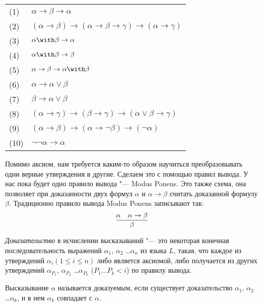 \begin{tabular}{ll}
(1) & $\alpha \rightarrow \beta \rightarrow \alpha$ \\
(2) & $(\alpha \rightarrow \beta) \rightarrow (\alpha \rightarrow \beta \rightarrow \gamma) \rightarrow (\alpha \rightarrow \gamma)$ \\
(3) & $\alpha \with \beta \rightarrow \alpha$\\
(4) & $\alpha \with \beta \rightarrow \beta$\\
(5) & $\alpha \rightarrow \beta \rightarrow \alpha \with \beta$\\
(6) & $\alpha \rightarrow \alpha \vee \beta$\\
(7) & $\beta \rightarrow \alpha \vee \beta$\\
(8) & $(\alpha \rightarrow \gamma) \rightarrow (\beta \rightarrow \gamma) \rightarrow (\alpha \vee \beta \rightarrow \gamma)$\\
(9) & $(\alpha \rightarrow \beta) \rightarrow (\alpha \rightarrow \neg \beta) \rightarrow (\neg \alpha)$\\
(10) & $\neg \neg \alpha \rightarrow \alpha$
\end{tabular}

Помимо аксиом, нам требуется каким-то образом научиться преобразовывать одни верные утверждения
в другие.
Сделаем это с помощью правил вывода. У нас пока будет одно правило вывода "--- Modus Ponens.
Это также схема, она позволяет при доказанности двух формул $\alpha$ и $\alpha \rightarrow \beta$
считать доказанной формулу $\beta$. Традиционно правило вывода Modus Ponens записывают так:
\[\infer{\beta}{\alpha & \alpha \rightarrow \beta}\]

\begin{definition}[доказательство] \emph{Доказательство} в исчислении высказываний "--- 
это некоторая конечная последовательность выражений 
$\alpha_1$, $\alpha_2$ \dots $\alpha_n$
из языка $L$, такая, что каждое из утверждений $\alpha_i (1 \le i \le n)$
либо является аксиомой, либо получается из других
утверждений $\alpha_{P_1}$, $\alpha_{P_2}$ \dots $\alpha_{P_k}$ 
($P_1 \dots P_k < i$) по правилу вывода.
\end{definition}

\begin{definition}[доказуемость] Высказывание $\alpha$ называется доказуемым, если 
существует доказательство $\alpha_1$, $\alpha_2$ \dots $\alpha_k$, и в нем
$\alpha_k$ совпадает с $\alpha$. 
\end{definition}

